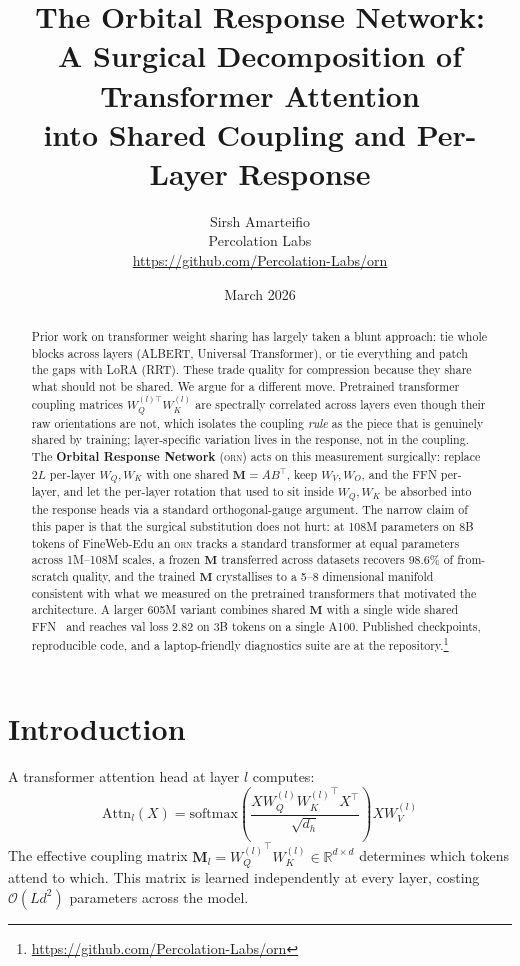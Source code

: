 \documentclass[10pt,twocolumn]{article}
\title{%
    \textbf{The Orbital Response Network:}\\[4pt]
    \large A Surgical Decomposition of Transformer Attention\\
    into Shared Coupling and Per-Layer Response%
}
\author{%
    Sirsh Amarteifio\\
    {\small Percolation Labs}\\
    {\small \url{https://github.com/Percolation-Labs/orn}}%
}
\date{March 2026}
\newcommand{\M}{\mathbf{M}}
\newcommand{\R}{\mathbb{R}}
\newcommand{\bigO}{\mathcal{O}}
\newcommand{\orn}{\textsc{orn}}
\begin{document}
\maketitle

\begin{abstract}
Prior work on transformer weight sharing has largely taken a blunt approach: tie whole blocks across layers (ALBERT, Universal Transformer), or tie everything and patch the gaps with LoRA (RRT). These trade quality for compression because they share what should not be shared.
We argue for a different move. Pretrained transformer coupling matrices $W_Q^{(l)\top} W_K^{(l)}$ are spectrally correlated across layers even though their raw orientations are not, which isolates the coupling \emph{rule} as the piece that is genuinely shared by training; layer-specific variation lives in the response, not in the coupling.
The \textbf{Orbital Response Network} (\orn{}) acts on this measurement surgically: replace $2L$ per-layer $W_Q, W_K$ with one shared $\M = AB^\top$, keep $W_V, W_O$, and the FFN per-layer, and let the per-layer rotation that used to sit inside $W_Q, W_K$ be absorbed into the response heads via a standard orthogonal-gauge argument.
The narrow claim of this paper is that the surgical substitution does not hurt: at 108M parameters on 8B tokens of FineWeb-Edu an \orn{} tracks a standard transformer at equal parameters across 1M--108M scales, a frozen $\M$ transferred across datasets recovers 98.6\% of from-scratch quality, and the trained $\M$ crystallises to a 5--8 dimensional manifold consistent with what we measured on the pretrained transformers that motivated the architecture.
A larger 605M variant combines shared $\M$ with a single wide shared FFN~\cite{onewideffn2023} and reaches val loss 2.82 on 3B tokens on a single A100. Published checkpoints, reproducible code, and a laptop-friendly diagnostics suite are at the repository.\footnote{\url{https://github.com/Percolation-Labs/orn}}
\end{abstract}

\section{Introduction}

A transformer attention head at layer $l$ computes:
\begin{equation}
\text{Attn}_l(X) = \text{softmax}\!\left(\frac{X W_Q^{(l)} {W_K^{(l)}}^\top X^\top}{\sqrt{d_h}}\right) X W_V^{(l)}
\end{equation}
The effective coupling matrix $\M_l = {W_Q^{(l)}}^\top W_K^{(l)} \in \R^{d \times d}$ determines which tokens attend to which.
This matrix is learned independently at every layer, costing $\bigO(Ld^2)$ parameters across the model.
\end{document}
